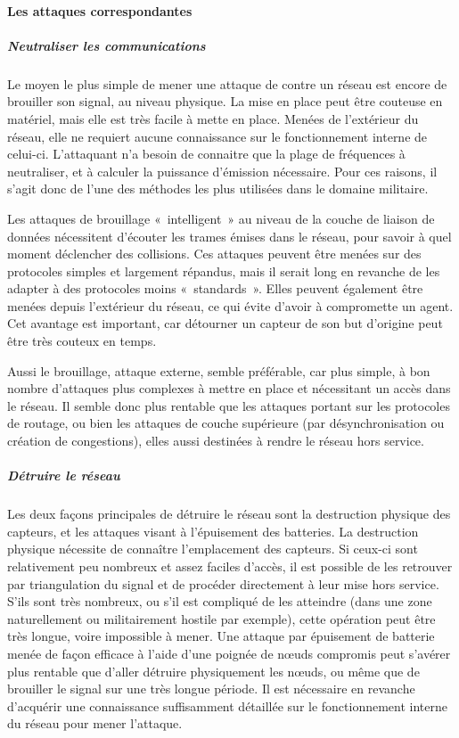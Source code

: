         \paragraph{Les attaques correspondantes}
            \subparagraph{Neutraliser les communications}
Le moyen le plus simple de mener une attaque de \dds contre un réseau est encore de brouiller son signal, au niveau physique.
La mise en place peut être couteuse en matériel, mais elle est très facile à mette en place.
Menées de l'extérieur du réseau, elle ne requiert aucune connaissance sur le fonctionnement interne de celui-ci.
L'attaquant n'a besoin de connaitre que la plage de fréquences à neutraliser, et à calculer la puissance d'émission nécessaire.
Pour ces raisons, il s'agit donc de l'une des méthodes les plus utilisées dans le domaine militaire.

Les attaques de brouillage « intelligent » au niveau de la couche de liaison de données nécessitent d'écouter les trames émises dans le réseau, pour savoir à quel moment déclencher des collisions.
Ces attaques peuvent être menées sur des protocoles simples et largement répandus, mais il serait long en revanche de les adapter à des protocoles moins « standards ».
Elles peuvent également être menées depuis l'extérieur du réseau, ce qui évite d'avoir à compromette un agent.
Cet avantage est important, car détourner un capteur de son but d'origine peut être très couteux en temps.

Aussi le brouillage, attaque externe, semble préférable, car plus simple, à bon nombre d'attaques plus complexes à mettre en place et nécessitant un accès dans le réseau.
Il semble donc plus rentable que les attaques portant sur les protocoles de routage, ou bien les attaques de couche supérieure (par désynchronisation ou création de congestions), elles aussi destinées à rendre le réseau hors service.

            \subparagraph{Détruire le réseau}
Les deux façons principales de détruire le réseau sont la destruction physique des capteurs, et les attaques visant à l'épuisement des batteries.
La destruction physique nécessite de connaître l'emplacement des capteurs.
Si ceux-ci sont relativement peu nombreux et assez faciles d'accès, il est possible de les retrouver par triangulation du signal et de procéder directement à leur mise hors service.
S'ils sont très nombreux, ou s'il est compliqué de les atteindre (dans une zone naturellement ou militairement hostile par exemple), cette opération peut être très longue, voire impossible à mener.
Une attaque par épuisement de batterie menée de façon efficace à l'aide d'une poignée de nœuds compromis peut s'avérer plus rentable que d'aller détruire physiquement les nœuds, ou même que de brouiller le signal sur une très longue période.
Il est nécessaire en revanche d'acquérir une connaissance suffisamment détaillée sur le fonctionnement interne du réseau pour mener l'attaque.

